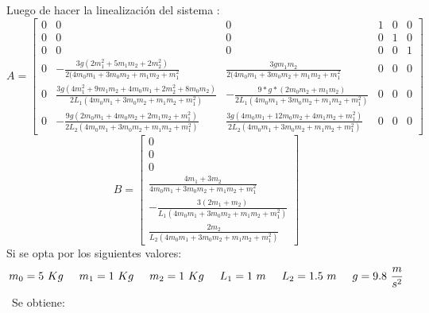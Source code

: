 %
%

Luego de hacer la linealización del sistema :
\begin{equation}
 A = \begin{bmatrix}
0 &  0 & 0 & 1 &  0 & 0\\

0 &  0 & 0 & 0 &  1 & 0\\
0 &  0 & 0 & 0 &  0 & 1\\

0 &  -\frac{3g(2m_1^2 + 5m_1m_2 + 2m_2^2)}{2(4m_0m_1 + 3m_0m_2 + m_1m_2 + m_1^2} & 
\frac{3gm_1m_2}{2(4m_0m_1 + 3m_0m_2 + m_1m_2 + m_1^2}  & 0 &  0 & 0\\

0 &  \frac{3g(4m_1^2 + 9m_1m_2 + 4m_0m_1 + 2m_2^2 + 8m_0m_2)}{2L_1(4m_0m_1 + 3m_0m_2 + m_1m_2 + m_1^2)} & -\frac{9*g*(2m_0m_2 + m_1m_2)}{2L_1(4m_0m_1 + 3m_0m_2 + m_1m_2 + m_1^2)}
 & 0 &  0 & 0\\

0 &   -\frac{9g(2m_0m_1 + 4m_0m_2 + 2m_1m_2 + m_1^2)}{2L_2(4m_0m_1 + 3m_0m_2 + m_1m_2 + m_1^2)} & \frac{3g(4m_0m_1 + 12m_0m_2 + 4m_1m_2 + m_1^2)}{2L_2(4m_0m_1 + 3m_0m_2 + m_1m_2 + m_1^2)} & 0 &  0 & 0
\end{bmatrix}
\end{equation}
\begin{equation}
 B = \begin{bmatrix}
0 \\
0 \\
0 \\
\frac{4m_1 + 3m_2}{4m_0m_1 + 3m_0m_2 + m_1m_2 + m_1^2} \\
 -\frac{3(2m_1 + m_2)}{L_1(4m_0m_1 + 3m_0m_2 + m_1m_2 + m_1^2)} \\
\frac{2m_2}{L_2(4m_0m_1 + 3m_0m_2 + m_1m_2 + m_1^2)}
\end{bmatrix}
\end{equation}
Si se opta por los siguientes valores:
\begin{equation}
m_0 = 5 \ Kg
\hspace{0.5cm}
m_1 = 1 \ Kg
\hspace{0.5cm}
m_2 = 1 \ Kg
\hspace{0.5cm}
L_1 = 1 \ m
\hspace{0.5cm}
L_2 = 1.5 \ m
\hspace{0.5cm}
g= 9.8 \ \frac{m}{s^2}
\end{equation}
\
Se obtiene:

